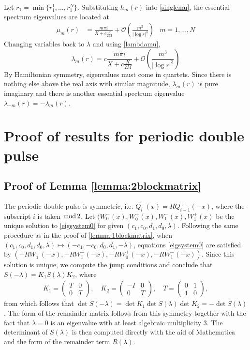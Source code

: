 \documentclass[10pt,reqno]{amsart}
\theoremstyle{plain}
\theoremstyle{definition}
\theoremstyle{remark}
\numberwithin{theorem}{section}
\numberwithin{equation}{section}
\begin{document}
Let $r_1 = \min\{ r_1^1, \dots, r_1^N \}$. Substituting $h_m(r)$ into \cref{singlemu}, the essential spectrum eigenvalues are located at
\begin{align*}
\mu_m(r) &= \frac{m \pi i}{X + c \frac{K}{2 M}} + \mathcal{O}\left( \frac{m^2}{|\log r|^3} \right) & m = 1, \dots, N
\end{align*}
Changing variables back to $\lambda$ and using \cref{lambdamu},
\[
\lambda_m(r) = c  \frac{m \pi i}{X + c \frac{K}{2 M}} + \mathcal{O}\left( \frac{m^3}{|\log r|^3} \right)
\]
By Hamiltonian symmetry, eigenvalues must come in quartets. Since there is nothing else above the real axis with similar magnitude, $\lambda_m(r)$ is pure imaginary and there is another essential spectrum eigenvalue $\lambda_{-m}(r) = -\lambda_m(r)$. 

\section{Proof of results for periodic double pulse}\label{sec:doublepulse}

\subsection{Proof of Lemma \ref{lemma:2blockmatrix} }

The periodic double pulse is symmetric, i.e. $Q_i^-(x) = R Q_{i-1}^+(-x)$, where the subscript $i$ is taken $\mathop\mathrm{mod}\nolimits 2$. Let $(W_0^-(x), W_0^+(x), W_1^-(x), W_1^+(x)$ be the unique solution to \cref{eigsystem0} for given $(c_1, c_0, d_1, d_0, \lambda)$. Following the same procedure as in the proof of \cref{lemma:1blockmatrix}, when $(c_1, c_0, d_1, d_0, \lambda) \mapsto (-c_1, -c_0, d_0, d_1, -\lambda)$, equations \cref{eigsystem0} are satisfied by $(-R W_1^+(-x), -R W_1^-(-x), -R W_0^+(-x), -R W_1^-(-x))$. Since this solution is unique, we compute the jump conditions and conclude that $S(-\lambda) = K_1 S(\lambda) K_2$, where
\begin{align*}
K_1 = \begin{pmatrix}T & 0 \\ 0 & T \end{pmatrix}, \quad
K_2 = \begin{pmatrix}-I & 0 \\ 0 & T \end{pmatrix}, \quad
T = \begin{pmatrix} 0 & 1 \\ 1 & 0 \end{pmatrix},
\end{align*}
from which follows that $\det S(-\lambda) = \det K_1 \det S(\lambda) \det K_2 = -\det S(\lambda)$. The form of the remainder matrix follows from this symmetry together with the fact that $\lambda = 0$ is an eigenvalue with at least algebraic multiplicity 3. The determinant of $S(\lambda)$ is then computed directly with the aid of Mathematica and the form of the remainder term $R(\lambda)$. 
\end{document}
